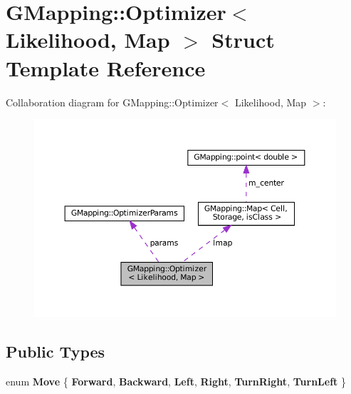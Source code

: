 \hypertarget{structGMapping_1_1Optimizer}{}\section{G\+Mapping\+:\+:Optimizer$<$ Likelihood, Map $>$ Struct Template Reference}
\label{structGMapping_1_1Optimizer}


Collaboration diagram for G\+Mapping\+:\+:Optimizer$<$ Likelihood, Map $>$\+:
\nopagebreak
\begin{figure}[H]
\begin{center}
\leavevmode
\includegraphics[width=350pt]{structGMapping_1_1Optimizer__coll__graph}
\end{center}
\end{figure}
\subsection*{Public Types}
\begin{DoxyCompactItemize}
\item 
\mbox{\label{structGMapping_1_1Optimizer_a2741a3d19153f7bc9a78a9b7ad559e35}} 
enum {\bfseries Move} \{ \newline
{\bfseries Forward}, 
{\bfseries Backward}, 
{\bfseries Left}, 
{\bfseries Right}, 
\newline
{\bfseries Turn\+Right}, 
{\bfseries Turn\+Left}
 \}
\end{DoxyCompactItemize}
